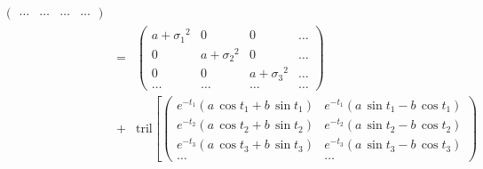 \documentclass[manuscript, letterpaper]{aastex6}
\begin{document}
\begin{eqnarray}
\begin{pmatrix}
    \ldots & \ldots & \ldots & \ldots
\end{pmatrix}\\
&=&
\begin{pmatrix}
    {\scriptscriptstyle a+{\sigma_1}^2} & {\scriptscriptstyle 0} & {\scriptscriptstyle 0} & \ldots\\
    {\scriptscriptstyle 0} & {\scriptscriptstyle a+{\sigma_2}^2 }& {\scriptscriptstyle 0} & \ldots\\
    {\scriptscriptstyle 0} & {\scriptscriptstyle 0} & {\scriptscriptstyle a + {\sigma_3}^2} & \ldots\\
    \ldots & \ldots & \ldots & \ldots
\end{pmatrix}\\
&+&\mathrm{tril}\left[\begin{pmatrix}
    {\scriptscriptstyle e^{-t_1}\left(a\,\cos{t_1}+b\,\sin{t_1}\right)}&
    {\scriptscriptstyle e^{-t_1}\left(a\,\sin{t_1}-b\,\cos{t_1}\right)}\\
    {\scriptscriptstyle e^{-t_2}\left(a\,\cos{t_2}+b\,\sin{t_2}\right)}&
    {\scriptscriptstyle e^{-t_2}\left(a\,\sin{t_2}-b\,\cos{t_2}\right)}\\
    {\scriptscriptstyle e^{-t_3}\left(a\,\cos{t_3}+b\,\sin{t_3}\right)}&
    {\scriptscriptstyle e^{-t_3}\left(a\,\sin{t_3}-b\,\cos{t_3}\right)}\\
   \ldots & \ldots
\end{pmatrix} %

\end{eqnarray}
\end{document}
